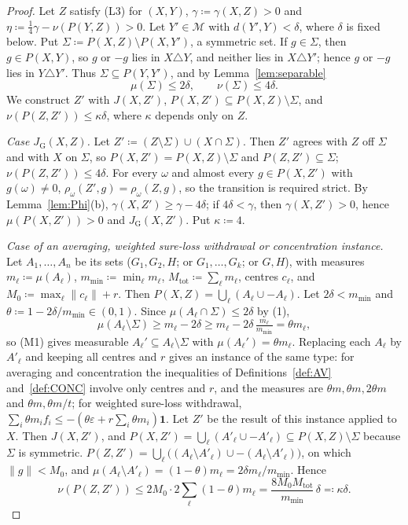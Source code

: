 \documentclass[11pt]{article}
\theoremstyle{definition}
\newcommand{\M}{\mathcal M}
\newcommand{\one}{\mathbf 1}
\newcommand{\GU}{\mathrm{G}}
\begin{document}
\begin{proof}
Let $Z$ satisfy (L3) for $(X,Y)$, $\gamma\coloneqq\gamma(X,Z)>0$ and $\eta\coloneqq\frac14\gamma-\nu(P(Y,Z))>0$. Let $Y'\in\M$ with $d(Y',Y)<\delta$, where $\delta$ is fixed below. Put $\Sigma\coloneqq P(X,Z)\setminus P(X,Y')$, a symmetric set. If $g\in\Sigma$, then $g\in P(X,Y)$, so $g$ or $-g$ lies in $X\triangle Y$, and neither lies in $X\triangle Y'$; hence $g$ or $-g$ lies in $Y\triangle Y'$. Thus $\Sigma\subseteq P(Y,Y')$, and by Lemma~\ref{lem:separable}
\[
\mu(\Sigma)\le2\delta,\qquad \nu(\Sigma)\le4\delta.\tag{1}
\]
We construct $Z'$ with $J(X,Z')$, $P(X,Z')\subseteq P(X,Z)\setminus\Sigma$, and $\nu(P(Z,Z'))\le\kappa\delta$, where $\kappa$ depends only on $Z$.

\emph{Case $J_\GU(X,Z)$.} Let $Z'\coloneqq(Z\setminus\Sigma)\cup(X\cap\Sigma)$. Then $Z'$ agrees with $Z$ off $\Sigma$ and with $X$ on $\Sigma$, so $P(X,Z')=P(X,Z)\setminus\Sigma$ and $P(Z,Z')\subseteq\Sigma$; $\nu(P(Z,Z'))\le4\delta$. For every $\omega$ and almost every $g\in P(X,Z')$ with $g(\omega)\ne0$, $\rho_\omega(Z',g)=\rho_\omega(Z,g)$, so the transition is required strict. By Lemma~\ref{lem:Phi}(b), $\gamma(X,Z')\ge\gamma-4\delta$; if $4\delta<\gamma$, then $\gamma(X,Z')>0$, hence $\mu(P(X,Z'))>0$ and $J_\GU(X,Z')$. Put $\kappa\coloneqq4$.

\emph{Case of an averaging, weighted sure-loss withdrawal or concentration instance.} Let $A_1,\dots,A_n$ be its sets ($G_1,G_2,H$; or $G_1,\dots,G_k$; or $G,H$), with measures $m_\ell\coloneqq\mu(A_\ell)$, $m_{\min}\coloneqq\min_\ell m_\ell$, $M_{\mathrm{tot}}\coloneqq\sum_\ell m_\ell$, centres $c_\ell$, and $M_0\coloneqq\max_\ell\|c_\ell\|+r$. Then $P(X,Z)=\bigcup_\ell(A_\ell\cup-A_\ell)$. Let $2\delta<m_{\min}$ and $\theta\coloneqq1-2\delta/m_{\min}\in(0,1)$. Since $\mu(A_\ell\cap\Sigma)\le2\delta$ by (1),
\[
\mu(A_\ell\setminus\Sigma)\ge m_\ell-2\delta\ge m_\ell-2\delta\,\tfrac{m_\ell}{m_{\min}}=\theta m_\ell,
\]
so (M1) gives measurable $A_\ell'\subseteq A_\ell\setminus\Sigma$ with $\mu(A_\ell')=\theta m_\ell$. Replacing each $A_\ell$ by $A'_\ell$ and keeping all centres and $r$ gives an instance of the same type: for averaging and concentration the inequalities of Definitions~\ref{def:AV} and~\ref{def:CONC} involve only centres and $r$, and the measures are $\theta m,\theta m,2\theta m$ and $\theta m,\theta m/t$; for weighted sure-loss withdrawal, $\sum_i\theta m_if_i\le-(\theta\varepsilon+r\sum_i\theta m_i)\one$. Let $Z'$ be the result of this instance applied to $X$. Then $J(X,Z')$, and $P(X,Z')=\bigcup_\ell(A'_\ell\cup-A'_\ell)\subseteq P(X,Z)\setminus\Sigma$ because $\Sigma$ is symmetric. $P(Z,Z')=\bigcup_\ell\bigl((A_\ell\setminus A'_\ell)\cup-(A_\ell\setminus A'_\ell)\bigr)$, on which $\|g\|<M_0$, and $\mu(A_\ell\setminus A'_\ell)=(1-\theta)m_\ell=2\delta m_\ell/m_{\min}$. Hence
\[
\nu(P(Z,Z'))\le2M_0\cdot2\sum_\ell(1-\theta)m_\ell=\frac{8M_0M_{\mathrm{tot}}}{m_{\min}}\,\delta\eqqcolon\kappa\delta.
\]


\end{proof}
\end{document}
